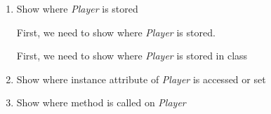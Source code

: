\documentclass[12pt]{article}
\begin{document}
\begin{enumerate}[1.]
\begin{mdframed}
        \begin{enumerate}[1.]
            \item Show where \textit{Player} is stored

            \bigskip

            First, we need to show where \textit{Player} is stored.

            \bigskip

            \begin{mdframed}

            First, we need to show where \textit{Player} is stored in class

            \end{mdframed}

            \item Show where instance attribute of \textit{Player} is accessed or set
            \item Show where method is called on \textit{Player}
        \end{enumerate}

    \end{mdframed}
\end{enumerate}
\end{document}
